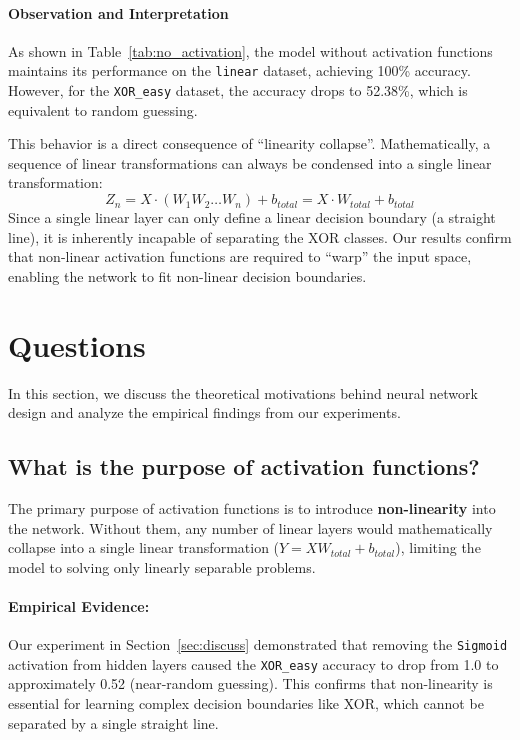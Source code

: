 \documentclass[10pt,twocolumn,letterpaper]{article}
\begin{document}
\paragraph{Observation and Interpretation}
As shown in Table~\ref{tab:no_activation}, the model without activation functions maintains its performance on the \texttt{linear} dataset, achieving 100\% accuracy. However, for the \texttt{XOR\_easy} dataset, the accuracy drops to 52.38\%, which is equivalent to random guessing. 

This behavior is a direct consequence of ``linearity collapse''. Mathematically, a sequence of linear transformations can always be condensed into a single linear transformation:
\[
    Z_n = X \cdot (W_1 W_2 \dots W_n) + b_{total} = X \cdot W_{total} + b_{total}
\]
Since a single linear layer can only define a linear decision boundary (a straight line), it is inherently incapable of separating the XOR classes. Our results confirm that non-linear activation functions are required to ``warp'' the input space, enabling the network to fit non-linear decision boundaries.


\section{Questions} \label{sec:question}

In this section, we discuss the theoretical motivations behind neural network design and analyze the empirical findings from our experiments.

\subsection{What is the purpose of activation functions?}
The primary purpose of activation functions is to introduce \textbf{non-linearity} into the network. Without them, any number of linear layers would mathematically collapse into a single linear transformation ($Y = XW_{total} + b_{total}$), limiting the model to solving only linearly separable problems.

\paragraph{Empirical Evidence:} Our experiment in Section~\ref{sec:discuss} demonstrated that removing the \texttt{Sigmoid} activation from hidden layers caused the \texttt{XOR\_easy} accuracy to drop from 1.0 to approximately 0.52 (near-random guessing). This confirms that non-linearity is essential for learning complex decision boundaries like XOR, which cannot be separated by a single straight line.
\end{document}
